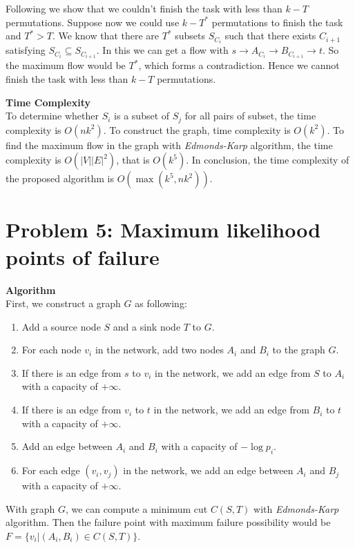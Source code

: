 \documentclass{article}
\newcommand{\Complexity}{\vspace{0.3cm} \noindent\textbf{Time Complexity} \\}
\newcommand{\Algorithm}{\textbf{Algorithm} \\}
\begin{document}
Following we show that we couldn't finish the task with less than $k-T$ permutations. Suppose now we
could use $k - T^*$ permutations to finish the task and $T^* > T$. We know that there are $T^*$
subsets $S_{C_i}$ such that there exists ${C_{i+1}}$ satisfying $S_{C_i} \subseteq S_{C_{i+1}}$. In
this we can get a flow with $s \rightarrow A_{C_i} \rightarrow B_{C_{i+1}} \rightarrow t$. So the
maximum flow would be $T^*$, which forms a contradiction. Hence we cannot finish the task with less
than $k-T$ permutations.

\Complexity
To determine whether $S_i$ is a subset of $S_j$ for all pairs of subset, the time complexity is 
$O(nk^2)$. To construct the graph, time complexity is $O(k^2)$. To find the maximum flow in the
graph with \textit{Edmonds-Karp} algorithm, the time complexity is $O(|V||E|^2)$, that is $O(k^5)$.
In conclusion, the time complexity of the proposed algorithm is $O(\max(k^5, nk^2))$.

\section*{Problem 5: Maximum likelihood points of failure}
\Algorithm
First, we construct a graph $G$ as following:
\begin{enumerate}
  \item Add a source node $S$ and a sink node $T$ to $G$.
  \item For each node $v_i$ in the network, add two nodes $A_i$ and $B_i$ to the graph $G$.   
  \item If there is an edge from $s$ to $v_i$ in the network, we add an edge from $S$ to $A_i$ with
    a capacity of $+\infty$.
  \item If there is an edge from $v_i$ to $t$ in the network, we add an edge from $B_i$ to $t$ with
    a capacity of $+\infty$.
  \item Add an edge between $A_i$ and $B_i$ with a capacity of $-\log p_i$.  
  \item For each edge $(v_i, v_j)$ in the network, we add an edge between $A_i$ and $B_j$ with a
    capacity of $+\infty$.   
\end{enumerate}

With graph $G$, we can compute a minimum cut $C(S, T)$ with \textit{Edmonds-Karp} algorithm. Then
the failure point with maximum failure possibility would be $F = \{v_i | (A_i, B_i) \in C(S, T)\}$.
\end{document}
